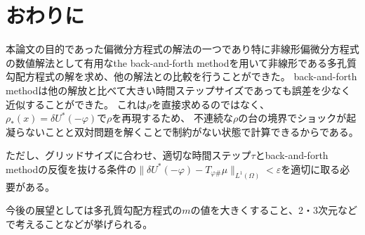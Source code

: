 \chapter{おわりに} \label{ch:conclusion}
本論文の目的であった偏微分方程式の解法の一つであり特に非線形偏微分方程式の数値解法として有用なthe back-and-forth methodを用いて非線形である多孔質勾配方程式の解を求め、他の解法との比較を行うことができた。
back-and-forth methodは他の解放と比べて大きい時間ステップサイズであっても誤差を少なく近似することができた。
これは$\rho$を直接求めるのではなく、$\rho_*(x) = \delta U^*(- \varphi)$で$\rho$を再現するため、
不連続な$\rho$の台の境界でショックが起凝らないことと双対問題を解くことで制約がない状態で計算できるからである。

ただし、グリッドサイズに合わせ、適切な時間ステップ$\tau$とback-and-forth methodの反復を抜ける条件の$\|\delta U^*(- \varphi) - T_{\varphi \#} \mu \|_{L^1(\Omega)} < \varepsilon$を適切に取る必要がある。

今後の展望としては多孔質勾配方程式の$m$の値を大きくすること、2・3次元などで考えることなどが挙げられる。
